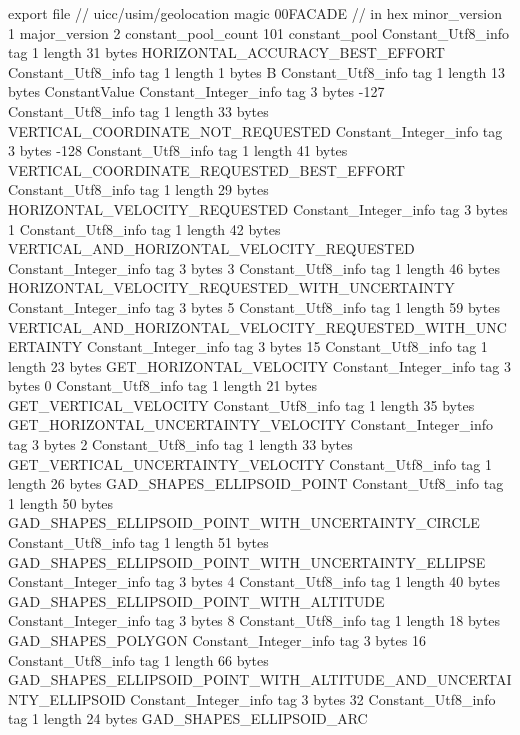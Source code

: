 export file {		// uicc/usim/geolocation
	magic	00FACADE		 // in hex
	minor_version	1
	major_version	2
	constant_pool_count	101
	constant_pool {
		Constant_Utf8_info {
			tag	1
			length	31
			bytes	HORIZONTAL_ACCURACY_BEST_EFFORT
		}
		Constant_Utf8_info {
			tag	1
			length	1
			bytes	B
		}
		Constant_Utf8_info {
			tag	1
			length	13
			bytes	ConstantValue
		}
		Constant_Integer_info {
			tag	3
			bytes	-127
		}
		Constant_Utf8_info {
			tag	1
			length	33
			bytes	VERTICAL_COORDINATE_NOT_REQUESTED
		}
		Constant_Integer_info {
			tag	3
			bytes	-128
		}
		Constant_Utf8_info {
			tag	1
			length	41
			bytes	VERTICAL_COORDINATE_REQUESTED_BEST_EFFORT
		}
		Constant_Utf8_info {
			tag	1
			length	29
			bytes	HORIZONTAL_VELOCITY_REQUESTED
		}
		Constant_Integer_info {
			tag	3
			bytes	1
		}
		Constant_Utf8_info {
			tag	1
			length	42
			bytes	VERTICAL_AND_HORIZONTAL_VELOCITY_REQUESTED
		}
		Constant_Integer_info {
			tag	3
			bytes	3
		}
		Constant_Utf8_info {
			tag	1
			length	46
			bytes	HORIZONTAL_VELOCITY_REQUESTED_WITH_UNCERTAINTY
		}
		Constant_Integer_info {
			tag	3
			bytes	5
		}
		Constant_Utf8_info {
			tag	1
			length	59
			bytes	VERTICAL_AND_HORIZONTAL_VELOCITY_REQUESTED_WITH_UNCERTAINTY
		}
		Constant_Integer_info {
			tag	3
			bytes	15
		}
		Constant_Utf8_info {
			tag	1
			length	23
			bytes	GET_HORIZONTAL_VELOCITY
		}
		Constant_Integer_info {
			tag	3
			bytes	0
		}
		Constant_Utf8_info {
			tag	1
			length	21
			bytes	GET_VERTICAL_VELOCITY
		}
		Constant_Utf8_info {
			tag	1
			length	35
			bytes	GET_HORIZONTAL_UNCERTAINTY_VELOCITY
		}
		Constant_Integer_info {
			tag	3
			bytes	2
		}
		Constant_Utf8_info {
			tag	1
			length	33
			bytes	GET_VERTICAL_UNCERTAINTY_VELOCITY
		}
		Constant_Utf8_info {
			tag	1
			length	26
			bytes	GAD_SHAPES_ELLIPSOID_POINT
		}
		Constant_Utf8_info {
			tag	1
			length	50
			bytes	GAD_SHAPES_ELLIPSOID_POINT_WITH_UNCERTAINTY_CIRCLE
		}
		Constant_Utf8_info {
			tag	1
			length	51
			bytes	GAD_SHAPES_ELLIPSOID_POINT_WITH_UNCERTAINTY_ELLIPSE
		}
		Constant_Integer_info {
			tag	3
			bytes	4
		}
		Constant_Utf8_info {
			tag	1
			length	40
			bytes	GAD_SHAPES_ELLIPSOID_POINT_WITH_ALTITUDE
		}
		Constant_Integer_info {
			tag	3
			bytes	8
		}
		Constant_Utf8_info {
			tag	1
			length	18
			bytes	GAD_SHAPES_POLYGON
		}
		Constant_Integer_info {
			tag	3
			bytes	16
		}
		Constant_Utf8_info {
			tag	1
			length	66
			bytes	GAD_SHAPES_ELLIPSOID_POINT_WITH_ALTITUDE_AND_UNCERTAINTY_ELLIPSOID
		}
		Constant_Integer_info {
			tag	3
			bytes	32
		}
		Constant_Utf8_info {
			tag	1
			length	24
			bytes	GAD_SHAPES_ELLIPSOID_ARC
}}}
